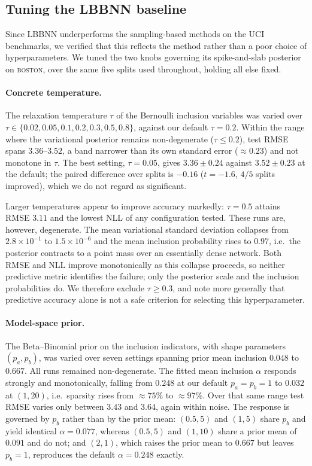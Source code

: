 \subsection{Tuning the LBBNN baseline}
\label{sec:lbbnn-tuning}

Since LBBNN underperforms the sampling-based methods on the UCI
benchmarks, we verified that this reflects the method rather than a poor
choice of hyperparameters. We tuned the two knobs governing its
spike-and-slab posterior on \textsc{boston}, over the same five splits
used throughout, holding all else fixed.

\paragraph{Concrete temperature.}
The relaxation temperature $\tau$ of the Bernoulli inclusion variables was
varied over $\tau \in \{0.02, 0.05, 0.1, 0.2, 0.3, 0.5, 0.8\}$, against our
default $\tau = 0.2$. Within the range where the variational posterior
remains non-degenerate ($\tau \leq 0.2$), test RMSE spans $3.36$--$3.52$,
a band narrower than its own standard error ($\approx 0.23$) and not
monotone in $\tau$. The best setting, $\tau = 0.05$, gives
$3.36 \pm 0.24$ against $3.52 \pm 0.23$ at the default; the paired
difference over splits is $-0.16$ ($t = -1.6$, $4/5$ splits improved),
which we do not regard as significant.

Larger temperatures appear to improve accuracy markedly: $\tau = 0.5$
attains RMSE $3.11$ and the lowest NLL of any configuration tested. These
runs are, however, degenerate. The mean variational standard deviation
collapses from $2.8 \times 10^{-1}$ to $1.5 \times 10^{-6}$ and the mean
inclusion probability rises to $0.97$, i.e.\ the posterior contracts to a
point mass over an essentially dense network. Both RMSE and NLL improve
monotonically as this collapse proceeds, so neither predictive metric
identifies the failure; only the posterior scale and the inclusion
probabilities do. We therefore exclude $\tau \geq 0.3$, and note more
generally that predictive accuracy alone is not a safe criterion for
selecting this hyperparameter.

\paragraph{Model-space prior.}
The Beta--Binomial prior on the inclusion indicators, with shape
parameters $(p_a, p_b)$, was varied over seven settings spanning prior
mean inclusion $0.048$ to $0.667$. All runs remained non-degenerate. The
fitted mean inclusion $\alpha$ responds strongly and monotonically,
falling from $0.248$ at our default $p_a = p_b = 1$ to $0.032$ at
$(1, 20)$, i.e.\ sparsity rises from ${\approx}75\%$ to ${\approx}97\%$.
Over that same range test RMSE varies only between $3.43$ and $3.64$,
again within noise. The response is governed by $p_b$ rather than by the
prior mean: $(0.5, 5)$ and $(1, 5)$ share $p_b$ and yield identical
$\alpha = 0.077$, whereas $(0.5, 5)$ and $(1, 10)$ share a prior mean of
$0.091$ and do not; and $(2, 1)$, which raises the prior mean to $0.667$
but leaves $p_b = 1$, reproduces the default $\alpha = 0.248$ exactly.

